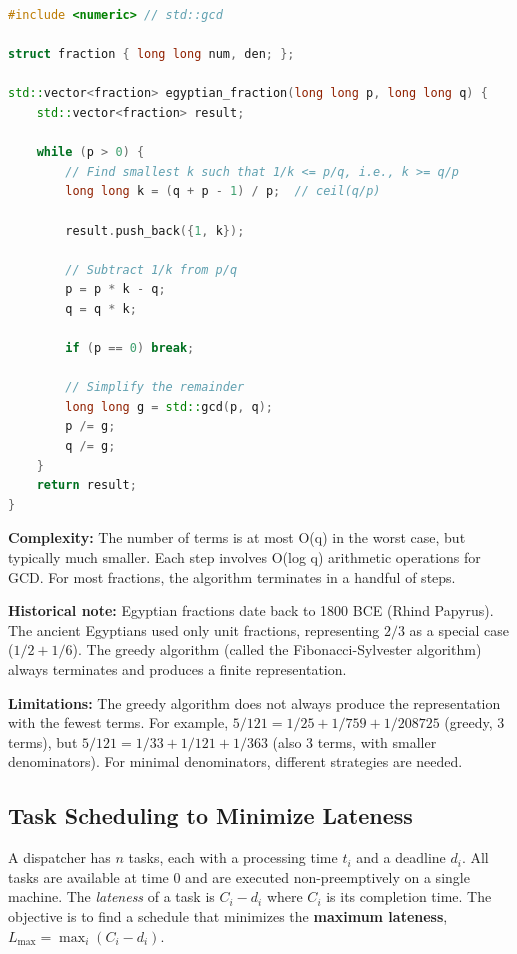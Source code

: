 \begin{lstlisting}[language=C++]
#include <numeric> // std::gcd

struct fraction { long long num, den; };

std::vector<fraction> egyptian_fraction(long long p, long long q) {
    std::vector<fraction> result;

    while (p > 0) {
        // Find smallest k such that 1/k <= p/q, i.e., k >= q/p
        long long k = (q + p - 1) / p;  // ceil(q/p)

        result.push_back({1, k});

        // Subtract 1/k from p/q
        p = p * k - q;
        q = q * k;

        if (p == 0) break;

        // Simplify the remainder
        long long g = std::gcd(p, q);
        p /= g;
        q /= g;
    }
    return result;
}
\end{lstlisting}

\textbf{Complexity:} The number of terms is at most O(q) in the worst case, but typically much smaller. Each step involves O(log q) arithmetic operations for GCD. For most fractions, the algorithm terminates in a handful of steps.

\textbf{Historical note:} Egyptian fractions date back to 1800 BCE (Rhind Papyrus). The ancient Egyptians used only unit fractions, representing $2/3$ as a special case ($1/2 + 1/6$). The greedy algorithm (called the Fibonacci-Sylvester algorithm) always terminates and produces a finite representation.

\textbf{Limitations:} The greedy algorithm does not always produce the representation with the fewest terms. For example, $5/121 = 1/25 + 1/759 + 1/208725$ (greedy, 3 terms), but $5/121 = 1/33 + 1/121 + 1/363$ (also 3 terms, with smaller denominators). For minimal denominators, different strategies are needed.

\subsection{Task Scheduling to Minimize Lateness}

A dispatcher has $n$ tasks, each with a processing time $t_i$ and a deadline $d_i$. All tasks are available at time 0 and are executed non-preemptively on a single machine. The \emph{lateness} of a task is $C_i - d_i$ where $C_i$ is its completion time. The objective is to find a schedule that minimizes the \textbf{maximum lateness}, $L_{\max} = \max_i (C_i - d_i)$.

